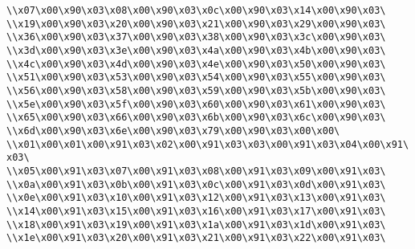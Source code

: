 \verb|\\x07\x00\x90\x03\x08\x00\x90\x03\x0c\x00\x90\x03\x14\x00\x90\x03\|\newline
\verb|\\x19\x00\x90\x03\x20\x00\x90\x03\x21\x00\x90\x03\x29\x00\x90\x03\|\newline
\verb|\\x36\x00\x90\x03\x37\x00\x90\x03\x38\x00\x90\x03\x3c\x00\x90\x03\|\newline
\verb|\\x3d\x00\x90\x03\x3e\x00\x90\x03\x4a\x00\x90\x03\x4b\x00\x90\x03\|\newline
\verb|\\x4c\x00\x90\x03\x4d\x00\x90\x03\x4e\x00\x90\x03\x50\x00\x90\x03\|\newline
\verb|\\x51\x00\x90\x03\x53\x00\x90\x03\x54\x00\x90\x03\x55\x00\x90\x03\|\newline
\verb|\\x56\x00\x90\x03\x58\x00\x90\x03\x59\x00\x90\x03\x5b\x00\x90\x03\|\newline
\verb|\\x5e\x00\x90\x03\x5f\x00\x90\x03\x60\x00\x90\x03\x61\x00\x90\x03\|\newline
\verb|\\x65\x00\x90\x03\x66\x00\x90\x03\x6b\x00\x90\x03\x6c\x00\x90\x03\|\newline
\verb|\\x6d\x00\x90\x03\x6e\x00\x90\x03\x79\x00\x90\x03\x00\x00\|\newline
\verb|\\x01\x00\x01\x00\x91\x03\x02\x00\x91\x03\x03\x00\x91\x03\x04\x00\x91\x03\|\newline
\verb|\\x05\x00\x91\x03\x07\x00\x91\x03\x08\x00\x91\x03\x09\x00\x91\x03\|\newline
\verb|\\x0a\x00\x91\x03\x0b\x00\x91\x03\x0c\x00\x91\x03\x0d\x00\x91\x03\|\newline
\verb|\\x0e\x00\x91\x03\x10\x00\x91\x03\x12\x00\x91\x03\x13\x00\x91\x03\|\newline
\verb|\\x14\x00\x91\x03\x15\x00\x91\x03\x16\x00\x91\x03\x17\x00\x91\x03\|\newline
\verb|\\x18\x00\x91\x03\x19\x00\x91\x03\x1a\x00\x91\x03\x1d\x00\x91\x03\|\newline
\verb|\\x1e\x00\x91\x03\x20\x00\x91\x03\x21\x00\x91\x03\x22\x00\x91\x03\|\newline
